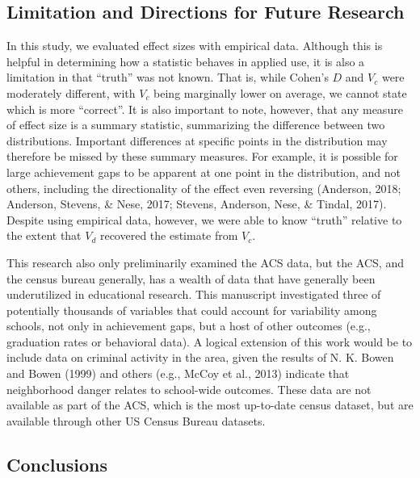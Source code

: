 \documentclass[man, fleqn, noextraspace]{apa6}
\theoremstyle{definition}
\theoremstyle{definition}
\theoremstyle{definition}
\theoremstyle{remark}
\begin{document}
\hypertarget{limitation-and-directions-for-future-research}{%
\subsection{Limitation and Directions for Future
Research}\label{limitation-and-directions-for-future-research}}

In this study, we evaluated effect sizes with empirical data. Although
this is helpful in determining how a statistic behaves in applied use,
it is also a limitation in that \enquote{truth} was not known. That is,
while Cohen's \(D\) and \(V_c\) were moderately different, with \(V_c\)
being marginally lower on average, we cannot state which is more
\enquote{correct}. It is also important to note, however, that any
measure of effect size is a summary statistic, summarizing the
difference between two distributions. Important differences at specific
points in the distribution may therefore be missed by these summary
measures. For example, it is possible for large achievement gaps to be
apparent at one point in the distribution, and not others, including the
directionality of the effect even reversing (Anderson, 2018; Anderson,
Stevens, \& Nese, 2017; Stevens, Anderson, Nese, \& Tindal, 2017).
Despite using empirical data, however, we were able to know
\enquote{truth} relative to the extent that \(V_d\) recovered the
estimate from \(V_c\).

This research also only preliminarily examined the ACS data, but the
ACS, and the census bureau generally, has a wealth of data that have
generally been underutilized in educational research. This manuscript
investigated three of potentially thousands of variables that could
account for variability among schools, not only in achievement gaps, but
a host of other outcomes (e.g., graduation rates or behavioral data). A
logical extension of this work would be to include data on criminal
activity in the area, given the results of N. K. Bowen and Bowen (1999)
and others (e.g., McCoy et al., 2013) indicate that neighborhood danger
relates to school-wide outcomes. These data are not available as part of
the ACS, which is the most up-to-date census dataset, but are available
through other US Census Bureau datasets.

\hypertarget{conclusions}{%
\subsection{Conclusions}\label{conclusions}}
\end{document}
